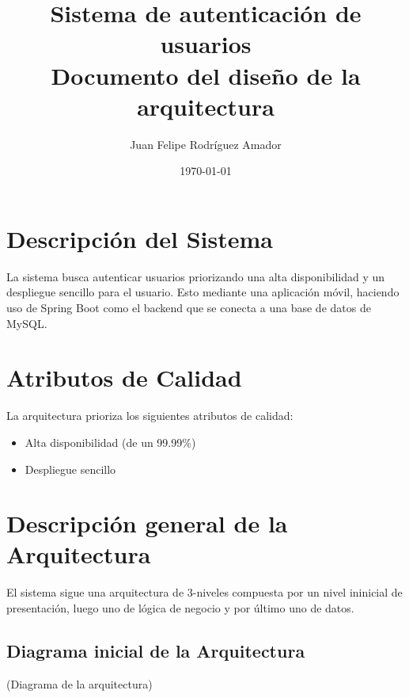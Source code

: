 \documentclass[12pt,a4paper]{article}
\title{
  \textbf{Sistema de autenticación de usuarios}\\
  \large Documento del diseño de la arquitectura
}
\author{
  Juan Felipe Rodríguez Amador
}
\date{\today}
\begin{document}
\maketitle



\section{Descripción del Sistema}

La sistema busca autenticar usuarios priorizando una alta
disponibilidad y un despliegue sencillo para el usuario. Esto
mediante una aplicación móvil,
haciendo uso de Spring Boot como el backend que se conecta a una base
de datos de MySQL.

\section{Atributos de Calidad}

La arquitectura prioriza los siguientes atributos de calidad:

\begin{itemize}
  \item Alta disponibilidad (de un 99.99\%)
  \item Despliegue sencillo
\end{itemize}

\section{Descripción general de la Arquitectura}

El sistema sigue una arquitectura de 3-niveles compuesta por un nivel
ininicial de presentación, luego uno de lógica de negocio y por
último uno de datos.

\subsection{Diagrama inicial de la Arquitectura}

(Diagrama de la arquitectura)
\end{document}
